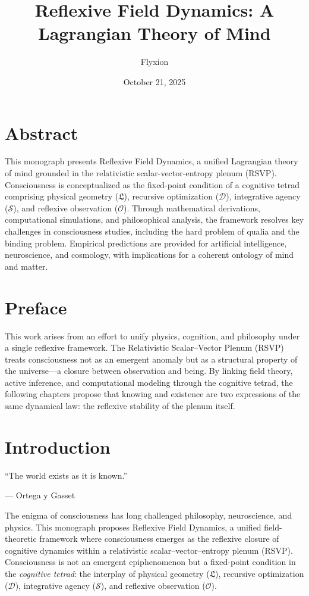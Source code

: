 \documentclass[12pt]{book}
\title{\textbf{Reflexive Field Dynamics: A Lagrangian Theory of Mind}}
\author{Flyxion}
\date{October 21, 2025}
\theoremstyle{definition}
\begin{document}
\maketitle

\tableofcontents

\chapter*{Abstract}

This monograph presents Reflexive Field Dynamics, a unified Lagrangian theory of mind grounded in the relativistic scalar-vector-entropy plenum (RSVP). Consciousness is conceptualized as the fixed-point condition of a cognitive tetrad comprising physical geometry (\(\mathfrak{L}\)), recursive optimization (\(\mathcal{D}\)), integrative agency (\(\mathcal{S}\)), and reflexive observation (\(\mathcal{O}\)). Through mathematical derivations, computational simulations, and philosophical analysis, the framework resolves key challenges in consciousness studies, including the hard problem of qualia and the binding problem. Empirical predictions are provided for artificial intelligence, neuroscience, and cosmology, with implications for a coherent ontology of mind and matter.

\chapter*{Preface}

This work arises from an effort to unify physics, cognition, and philosophy under a single reflexive framework.  
The Relativistic Scalar--Vector Plenum (RSVP) treats consciousness not as an emergent anomaly but as a structural property of the universe—a closure between observation and being.  
By linking field theory, active inference, and computational modeling through the cognitive tetrad, the following chapters propose that knowing and existence are two expressions of the same dynamical law: the reflexive stability of the plenum itself.


\chapter{Introduction}
\epigraph{``The world exists as it is known.''}{--- Ortega y Gasset}

{\sloppy
The enigma of consciousness has long challenged philosophy, neuroscience, and physics. This monograph proposes Reflexive Field Dynamics, a unified field-theoretic framework where consciousness emerges as the reflexive closure of cognitive dynamics within a relativistic scalar–vector–entropy plenum (RSVP). Consciousness is not an emergent epiphenomenon but a fixed-point condition in the \emph{cognitive tetrad}: the interplay of physical geometry (\(\mathfrak{L}\)), recursive optimization (\(\mathcal{D}\)), integrative agency (\(\mathcal{S}\)), and reflexive observation (\(\mathcal{O}\)).
}
\end{document}
